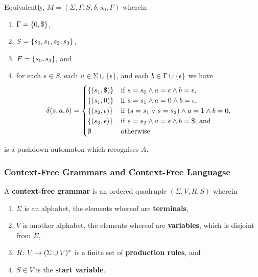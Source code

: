     \noindent Equivalently, \(M = (\Sigma, \Gamma, S, \delta, s_0, F)\)
    wherein
    \begin{enumerate}
        \item \(\Gamma = \{0, \$\}\),
        \item \(S = \{s_0, s_1, s_2, s_3\}\),
        \item \(F = \{s_0, s_3\}\), and
        \item for each \(s \in S\), each \(a \in \Sigma \cup
            \{\epsilon\}\), and each \(b \in \Gamma \cup
            \{\epsilon\}\) we have
            \[
                \delta(s, a, b) = \begin{cases}
                    \{(s_1, \$)\} & \text{if } s = s_0 \land a = \epsilon
                    \land b = \epsilon,\\
                    \{(s_1, 0)\} & \text{if } s = s_1 \land a = 0 \land b =
                    \epsilon,\\
                    \{(s_2, \epsilon)\} & \text{if } (s = s_1 \lor s = s_2)
                    \land a = 1 \land b = 0,\\
                    \{(s_3, \epsilon)\} & \text{if } s = s_2 \land a =
                    \epsilon \land b = \$ \text{, and}\\
                    \emptyset & \text{otherwise}
                \end{cases}
            \]
    \end{enumerate}
    is a pushdown automaton which recognises \(A\).
\Esl

\subsubsection{Context-Free Grammars and Context-Free Languagse}

\Bdf
    A {\bf context-free grammar} is an ordered quadruple \((\Sigma, V, R, S)\)
    wherein
    \begin{enumerate}
        \item \(\Sigma\) is an alphabet, the elements whereof are {\bf
        terminals},
        \item \(V\) is another alphabet, the elements whereof are {\bf
        variables}, which is disjoint from \(\Sigma\),
        \item \(R\colon V\to(\Sigma \cup V)^*\) is a finite set of {\bf
        production rules}, and
        \item \(S \in V\) is the {\bf start variable}.
    \end{enumerate}
\Edf

